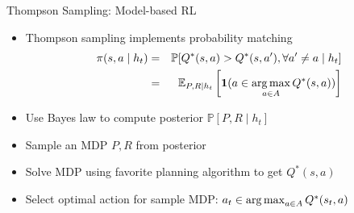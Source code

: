 \begin{frame}[c]{Thompson Sampling: Model-based RL}
	
	\begin{itemize}
		\item Thompson sampling implements probability matching
	\begin{eqnarray}
	\pi(s, a \mid h_t) &=& \mathbb{P} [Q^*(s,a) > Q^*(s,a'), \forall a' \neq a \mid h_t]\nonumber \\
	&=& \mathbb{E}_{P, R \mid h_t} \left[\mathbf{1}(a \in \operatorname*{arg\,max}_{a \in A} Q^*(s,a))\right]		\nonumber
	\end{eqnarray}		
	\item Use Bayes law to compute posterior $ \mathbb{P}[P, R \mid h_t]$
	\item Sample an MDP $P, R$ from posterior
	\item Solve MDP using favorite planning algorithm to get $Q^*(s,a)$
	\item Select optimal action for sample MDP: $a_t \in \operatorname*{arg\,max}_{a \in A}Q^*(s_t,a)$
	\end{itemize}
	
\end{frame}


